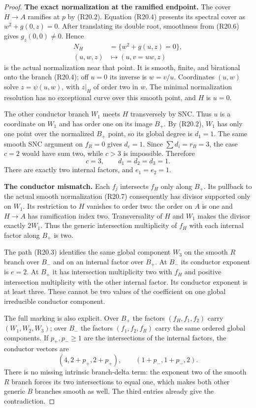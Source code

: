 \begin{proof}
\par\medskip\noindent\textbf{The exact normalization at the ramified endpoint.}
The cover $H\to A$ ramifies at $p$ by (R20.2).
Equation (R20.4) presents its spectral cover as
$w^2+g(0,z)=0$. After translating its double
root, smoothness from (R20.6) gives
$g_z(0,0)\ne0$. Hence
\[
 \begin{split}
        N_H&=\{w^2+g(u,z)=0\},\\
        (u,w,z)&\longmapsto(u,v=uw,z)
 \end{split}                                                   \tag{R20.7}
\]
is the actual normalization near that point.
It is smooth, finite, and birational onto the
branch (R20.4); off $u=0$ its inverse is
$w=v/u$. Coordinates $(u,w)$ solve
$z=\psi(u,w)$, with $z|_H$ of order two in
$w$. The minimal normalization resolution
has no exceptional curve over this smooth
point, and $H$ is $u=0$.

The other conductor branch $W_1$ meets $H$
transversely by SNC. Thus $u$ is a coordinate
on $W_1$ and has order one on its image
$B_+$. By (R20.2), $W_1$ has only one point
over the normalized $B_+$ point, so its
global degree is $d_1=1$. The same smooth
SNC argument on $f_R=0$ gives $d_c=1$.
Since $\sum d_i=r_B=3$, the case $c=2$
would have sum two, while $c>3$ is impossible.
Therefore
\[
                 c=3,\qquad d_1=d_2=d_3=1.              \tag{R20.8}
\]
There are exactly two internal factors, and
$e_1=e_2=1$.

\par\medskip\noindent\textbf{The conductor mismatch.}
Each $f_j$ intersects $f_H$ only along $B_+$.
Its pullback to the actual smooth normalization
(R20.7) consequently has divisor supported
only on $W_1$. Its restriction to $H$ vanishes
to order two: the order on $A$ is one and
$H\to A$ has ramification index two.
Transversality of $H$ and $W_1$ makes the
divisor exactly $2W_1$. Thus the generic
intersection multiplicity of $f_H$ with
each internal factor along $B_+$ is two.

The path (R20.3) identifies the same global
component $W_3$ on the smooth $R$ branch
over $B_-$ and on an internal factor over
$B_+$. At $B_-$ its conductor exponent is
$e=2$. At $B_+$ it has intersection
multiplicity two with $f_H$ and positive
intersection multiplicity with the other
internal factor. Its conductor exponent
is at least three. These cannot be two
values of the coefficient on one global
irreducible conductor component.

The full marking is also explicit. Over
$B_+$ the factors $(f_H,f_1,f_2)$ carry
$(W_1,W_2,W_3)$; over $B_-$ the factors
$(f_1,f_2,f_R)$ carry the same ordered
global components. If $p_+,p_-\ge1$ are
the intersections of the internal factors,
the conductor vectors are
\[
         (4,2+p_+,2+p_+),\qquad
         (1+p_-,1+p_-,2).
\]
There is no missing intrinsic branch-delta
term: the exponent two of the smooth $R$
branch forces its two intersections to
equal one, which makes both other generic
$B$ branches smooth as well. The third
entries already give the contradiction.


\end{proof}
